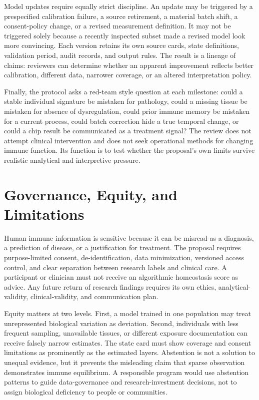 \documentclass[conference]{IEEEtran}
\begin{document}
Model updates require equally strict discipline. An update may be triggered by a prespecified calibration failure, a source retirement, a material batch shift, a consent-policy change, or a revised measurement definition. It may not be triggered solely because a recently inspected subset made a revised model look more convincing. Each version retains its own source cards, state definitions, validation period, audit records, and output rules. The result is a lineage of claims: reviewers can determine whether an apparent improvement reflects better calibration, different data, narrower coverage, or an altered interpretation policy.

Finally, the protocol asks a red-team style question at each milestone: could a stable individual signature be mistaken for pathology, could a missing tissue be mistaken for absence of dysregulation, could prior immune memory be mistaken for a current process, could batch correction hide a true temporal change, or could a chip result be communicated as a treatment signal? The review does not attempt clinical intervention and does not seek operational methods for changing immune function. Its function is to test whether the proposal's own limits survive realistic analytical and interpretive pressure.

\section{Governance, Equity, and Limitations}

Human immune information is sensitive because it can be misread as a diagnosis, a prediction of disease, or a justification for treatment. The proposal requires purpose-limited consent, de-identification, data minimization, versioned access control, and clear separation between research labels and clinical care. A participant or clinician must not receive an algorithmic homeostasis score as advice. Any future return of research findings requires its own ethics, analytical-validity, clinical-validity, and communication plan.

Equity matters at two levels. First, a model trained in one population may treat unrepresented biological variation as deviation. Second, individuals with less frequent sampling, unavailable tissues, or different exposure documentation can receive falsely narrow estimates. The state card must show coverage and consent limitations as prominently as the estimated layers. Abstention is not a solution to unequal evidence, but it prevents the misleading claim that sparse observation demonstrates immune equilibrium. A responsible program would use abstention patterns to guide data-governance and research-investment decisions, not to assign biological deficiency to people or communities.
\end{document}
